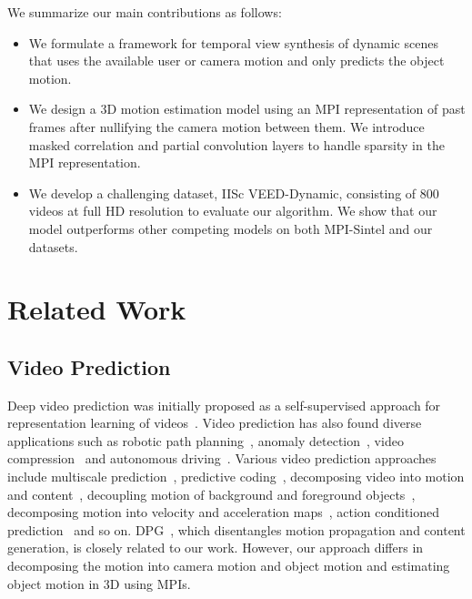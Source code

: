\documentclass[preprint]{vgtc}
\begin{document}
    We summarize our main contributions as follows:
    \begin{itemize}
        \item We formulate a framework for temporal view synthesis of dynamic scenes that uses the available user or camera motion and only predicts the object motion.
        \item We design a 3D motion estimation model using an MPI representation of past frames after nullifying the camera motion between them.
        We introduce masked correlation and partial convolution layers to handle sparsity in the MPI representation.
        \item We develop a challenging dataset, IISc VEED-Dynamic, consisting of 800 videos at full HD resolution to evaluate our algorithm.
        We show that our model outperforms other competing models on both MPI-Sintel and our datasets.
    \end{itemize}


    \section{Related Work}\label{sec:related-work}

    \subsection{Video Prediction}\label{subsec:related-work-video-prediction}
    Deep video prediction was initially proposed as a self-supervised approach for representation learning of videos~\cite{srivastava2015unsupervised}.
    Video prediction has also found diverse applications such as robotic path planning~\cite{finn2016unsupervised}, anomaly detection~\cite{liu2018future}, video compression~\cite{liu2021deep} and autonomous driving~\cite{lotter2017deep}.
    Various video prediction approaches include multiscale prediction~\cite{mathieu2016deep}, predictive coding~\cite{lotter2017deep}, decomposing video into motion and content~\cite{villegas2017mcnet,tulyakov2018mocogan}, decoupling motion of background and foreground objects~\cite{wu2020future}, decomposing motion into velocity and acceleration maps~\cite{sarkar2021decomposing}, action conditioned prediction~\cite{lee2018stochastic} and so on.
    DPG~\cite{gao2019disentangling}, which disentangles motion propagation and content generation, is closely related to our work.
    However, our approach differs in decomposing the motion into camera motion and object motion and estimating object motion in 3D using MPIs.
\end{document}
